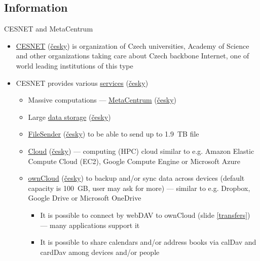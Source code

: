 \documentclass[compress, ucs, xelatex, 11pt, xcolor=svgnames, aspectratio=169,
	hyperref={
		bookmarks=true,
		unicode=true,
		colorlinks=true,
		pdftitle={Linux, command line and MetaCentrum},
		plainpages=false,
		pdfauthor={Vojtech Zeisek},
		pdfsubject={Course about use of Linux command line, writing shell scripts and using MetaCentrum of CESNET},
		pdfcreator={XeLaTeX},
		pdfkeywords={Linux, GNU, BASH, shell, command line, MetaCentrum},
		linkcolor=DarkRed, %
		anchorcolor=DarkBlue, %
		citecolor=Indigo, %
		filecolor=NavyBlue, %
		menucolor=DarkMagenta, %
		urlcolor=DarkBlue, %
		pdftex},
	url={hyphens, lowtilde} %
	]{beamer}
\begin{document}
\subsection{Information}

\begin{frame}[allowframebreaks]{CESNET and MetaCentrum}
	\label{CESNET}
	\begin{itemize}
		\item \href{https://www.cesnet.cz/?lang=en}{CESNET} (\href{https://www.cesnet.cz/}{česky}) is organization of Czech universities, Academy of Science and other organizations taking care about Czech backbone Internet, one of world leading institutions of this type
		\item CESNET provides various \href{https://www.cesnet.cz/services/?lang=en}{services} (\href{https://www.cesnet.cz/sluzby/}{česky})
		\begin{itemize}
			\item Massive computations --- \href{https://www.cesnet.cz/services/massive-computations-metacentrum/?lang=en}{MetaCentrum} (\href{https://www.cesnet.cz/sluzby/metacentrum/}{česky})
			\item Large \href{https://www.cesnet.cz/services/data-storage/?lang=en}{data storage} (\href{https://www.cesnet.cz/sluzby/datova-uloziste/}{česky})
			\item \href{https://www.cesnet.cz/services/filesender/?lang=en}{FileSender} (\href{https://www.cesnet.cz/sluzby/filesender/}{česky}) to be able to send up to 1.9~TB file
			\item \href{https://www.metacentrum.cz/en/Sluzby/Cloud/}{Cloud} (\href{https://www.metacentrum.cz/cs/Sluzby/Cloud/}{česky}) --- computing (HPC) cloud similar to e.g. Amazon Elastic Compute Cloud (EC2), Google Compute Engine or Microsoft Azure
			\item \href{https://www.cesnet.cz/services/owncloud/?lang=en}{ownCloud} (\href{https://www.cesnet.cz/sluzby/owncloud/}{česky}) to backup and/or sync data across devices (default capacity is 100~GB, user may ask for more) --- similar to e.g. Dropbox, Google Drive or Microsoft OneDrive
			\begin{itemize}
				\item It is possible to connect by webDAV to ownCloud (slide \ref{transfers}) --- many applications support it
				\item It is possible to share calendars and/or address books via calDav and cardDav among devices and/or people
			\end{itemize}

\end{itemize}
\end{itemize}
\end{frame}
\end{document}
